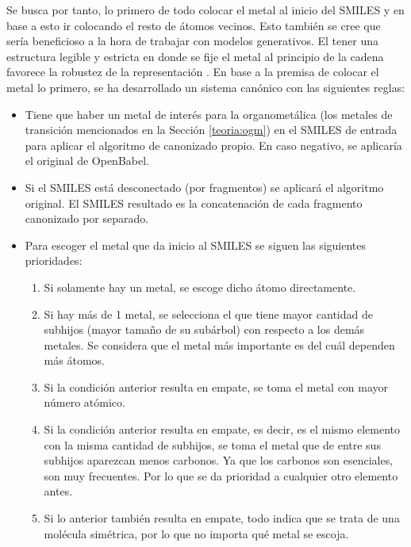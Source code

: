Se busca por tanto, lo primero de todo colocar el metal al inicio del SMILES y en base a esto ir colocando el resto de átomos vecinos. Esto también se cree que sería beneficioso a la hora de trabajar con modelos generativos. El tener una estructura legible y estricta en donde se fije el metal al principio de la cadena favorece la robustez de la representación \cite{SELFIES, krenn_self_referencing_2020}.
En base a la premisa de colocar el metal lo primero, se ha desarrollado un sistema canónico con las siguientes reglas:
\begin{itemize}
    \item Tiene que haber un metal de interés para la organometálica (los metales de transición mencionados en la Sección \ref{teoria:ogm}) en el SMILES de entrada para aplicar el algoritmo de canonizado propio. En caso negativo, se aplicaría el original de OpenBabel. 
    \item Si el SMILES está desconectado (por fragmentos) se aplicará el algoritmo original. El SMILES resultado es la concatenación de cada fragmento canonizado por separado.
    \item Para escoger el metal que da inicio al SMILES se siguen las siguientes prioridades:
        \begin{enumerate}
            \item Si solamente hay un metal, se escoge dicho átomo directamente.
            \item Si hay más de 1 metal, se selecciona el que tiene mayor cantidad de subhijos (mayor tamaño de su subárbol) con respecto a los demás metales. Se considera que el metal más importante es del cuál dependen más átomos.
            \item Si la condición anterior resulta en empate, se toma el metal con mayor número atómico.
            \item Si la condición anterior resulta en empate, es decir, es el mismo elemento con la misma cantidad de subhijos, se toma el metal que de entre sus subhijos aparezcan menos carbonos. Ya que los carbonos son esenciales, son muy frecuentes. Por lo que se da prioridad a cualquier otro elemento antes.
            \item Si lo anterior también resulta en empate, todo indica que se trata de una molécula simétrica, por lo que no importa qué metal se escoja.
        \end{enumerate}
\end{itemize}

